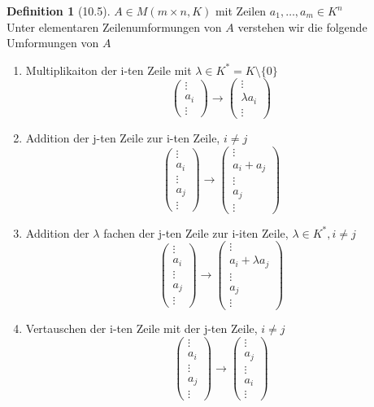 \documentclass[a4paper]{scrartcl}
\theoremstyle{definition}
\newtheorem{defn}{Definition}
\theoremstyle{plain}
\theoremstyle{plain}
\theoremstyle{remark}
\theoremstyle{remark}
\theoremstyle{remark}
\theoremstyle{remark}
\theoremstyle{remark}
\begin{document}
\begin{defn}[10.5]
$A \in M(m\times n, K)$ mit Zeilen $a_1, \ldots, a_m \in K^n$ \\
  Unter elementaren Zeilenumformungen von $A$ verstehen wir die folgende Umformungen von $A$
\begin{enumerate}
\item Multiplikaiton der i-ten Zeile mit $\lambda \in K^\ast = K \setminus\{0\}$
     \[\begin{pmatrix} \vdots \\ a_i \\ \vdots \end{pmatrix} \to \begin{pmatrix} \vdots \\ \lambda a_i \\ \vdots \end{pmatrix}\]
\item Addition der j-ten Zeile zur i-ten Zeile, $i\neq j$
     \[\begin{pmatrix} \vdots \\ a_i \\ \vdots \\ a_j \\ \vdots\end{pmatrix} \to \begin{pmatrix} \vdots \\ a_i + a_j \\ \vdots \\ a_j  \\ \vdots \end{pmatrix}\]
\item Addition der $\lambda$ fachen der j-ten Zeile zur i-iten Zeile, $\lambda \in K^\ast, i\neq j$
     \[\begin{pmatrix} \vdots \\ a_i \\ \vdots \\ a_j \\ \vdots\end{pmatrix} \to \begin{pmatrix} \vdots \\ a_i + \lambda a_j \\ \vdots \\ a_j  \\ \vdots \end{pmatrix}\]
\item Vertauschen der i-ten Zeile mit der j-ten Zeile, $i\neq j$
     \[\begin{pmatrix} \vdots \\ a_i \\ \vdots \\ a_j \\ \vdots\end{pmatrix} \to \begin{pmatrix} \vdots \\ a_j \\ \vdots \\ a_i  \\ \vdots \end{pmatrix}\]
\end{enumerate}
\end{defn}
\end{document}
